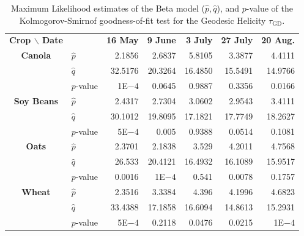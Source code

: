 \documentclass[journal]{IEEEtran}
\begin{document}
\begin{table}[hbt]
	\centering
	\caption{Maximum Likelihood estimates of the Beta model ($\widehat p,\widehat q$), and $p$-value of the Kolmogorov-Smirnof goodness-of-fit test for the Geodesic Helicity $\tau_{\text{GD}}$.}
	\label{tab:params_helicity}
	\setlength{\tabcolsep}{4pt}
	\begin{tabular}{clrrrrr}
		\toprule
		\textbf{Crop $\backslash$ Date} & & \textbf{16 May} & \textbf{9 June} & \textbf{3 July} & \textbf{27 July} & \textbf{20 Aug.}\\ \cmidrule(lr){1-2} \cmidrule(lr){3-3} \cmidrule(lr){4-4} \cmidrule(lr){5-5} \cmidrule(lr){6-6} \cmidrule(lr){7-7}
		\textbf{Canola} 	
		& $\widehat{p}$ & 2.1856  	& 2.6837    & 5.8105 	& 3.3877  	& 4.4111 \\
		& $\widehat{q}$ & 32.5176 	& 20.3264 	& 16.4850 	& 15.5491 	& 14.9766\\ 
		& $p$-value 	& 1E$-4$ 		& 0.0645 	& 0.9887 	& 0.3356 	& 0.0166\\		
		\midrule
		\textbf{Soy Beans}
		& $\widehat{p}$ & 2.4317   	& 2.7304   	& 3.0602   	& 2.9543   	& 3.4111 \\
		& $\widehat{q}$ & 30.1012   & 19.8095   & 17.1821   & 17.7749   & 18.2627 \\ 
		& $p$-value 	& 5E$-4$ 	& 0.005 	& 0.9388 	& 0.0514 	& 0.1081\\			
		\midrule
		\textbf{Oats}
		& $\widehat{p}$ & 2.3701   	& 2.1838  	& 3.529     & 4.2011 	& 4.7568 \\
		& $\widehat{q}$ & 26.533 	& 20.4121   & 16.4932 	& 16.1089  	& 15.9517 \\ 
		& $p$-value 	& 0.0016 	& 1E$-4$ 	& 0.541 	& 0.0078	& 0.1757 \\
		\midrule
		\textbf{Wheat} 
		& $\widehat{p}$ & 2.3516   	& 3.3384  	& 4.396  	& 4.1996  	& 4.6823   \\
		& $\widehat{q}$ & 33.4388   & 17.1858   & 16.6094   & 14.8613   & 15.2931   \\
		& $p$-value 	& 5E$-4$ 	& 0.2118 	& 0.0476 	& 0.0215 	& 1E$-4$\\	
		\bottomrule
	\end{tabular}
\end{table}
\end{document}
